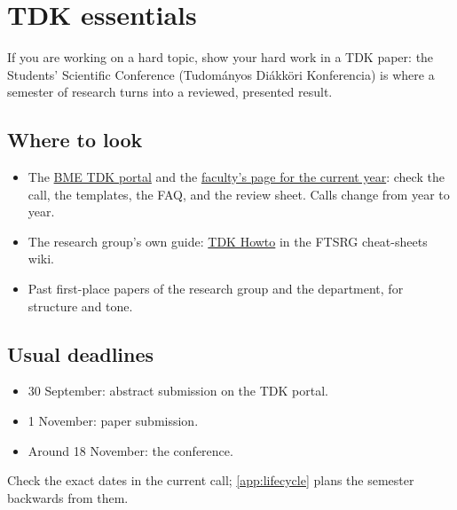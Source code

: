 \clearpage\section{TDK essentials}\label{app:tdk}
If you are working on a hard topic, show your hard work in a TDK paper: the Students' Scientific Conference (Tudományos Diákköri Konferencia) is where a semester of research turns into a reviewed, presented result.

\subsection{Where to look}
\begin{itemize}
  \item The \href{https://tdk.bme.hu/}{BME TDK portal} and the \href{https://tdk.bme.hu/conference/VIK/2026}{faculty's page for the current year}: check the call, the templates, the FAQ, and the review sheet. Calls change from year to year.
  \item The research group's own guide: \href{https://github.com/ftsrg/cheat-sheets/wiki/TDK-Howto}{TDK Howto} in the FTSRG cheat-sheets wiki.
  \item Past first-place papers of the research group and the department, for structure and tone.
\end{itemize}

\subsection{Usual deadlines}
\begin{itemize}
  \item 30 September: abstract submission on the TDK portal.
  \item 1 November: paper submission.
  \item Around 18 November: the conference.
\end{itemize}
Check the exact dates in the current call; \cref{app:lifecycle} plans the semester backwards from them.

